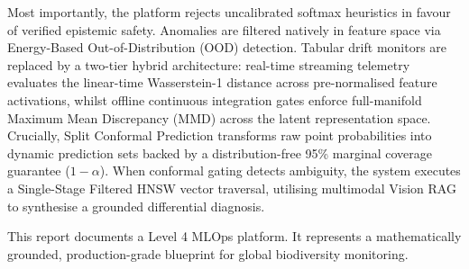 Most importantly, the platform rejects uncalibrated softmax heuristics in favour of verified epistemic safety. Anomalies are filtered natively in feature space via Energy-Based Out-of-Distribution (OOD) detection. Tabular drift monitors are replaced by a two-tier hybrid architecture: real-time streaming telemetry evaluates the linear-time Wasserstein-1 distance across pre-normalised feature activations, whilst offline continuous integration gates enforce full-manifold Maximum Mean Discrepancy (MMD) across the latent representation space. Crucially, Split Conformal Prediction transforms raw point probabilities into dynamic prediction sets backed by a distribution-free 95\% marginal coverage guarantee ($1 - \alpha$). When conformal gating detects ambiguity, the system executes a Single-Stage Filtered HNSW vector traversal, utilising multimodal Vision RAG to synthesise a grounded differential diagnosis.

This report documents a Level 4 MLOps platform. It represents a mathematically grounded, production-grade blueprint for global biodiversity monitoring.
